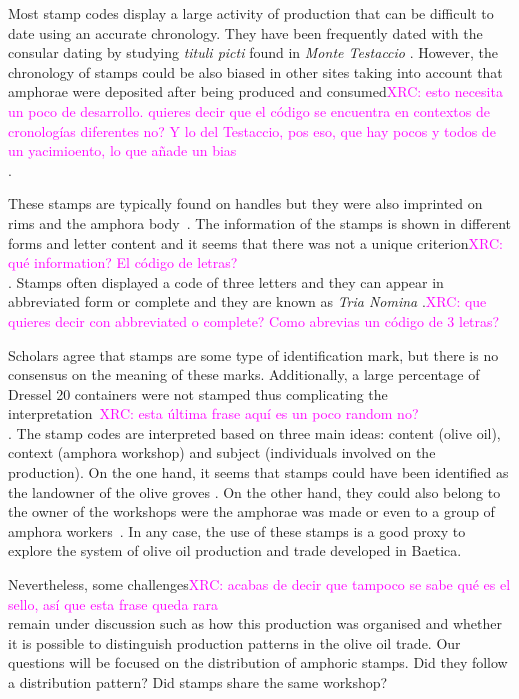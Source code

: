 \documentclass[review]{elsarticle}
\newcommand{\memo}[2]{\textcolor{#1}{#2}}
\newcommand{\xavi}[1]{\memo{magenta}{XRC: #1\\}}
\begin{document}
Most stamp codes display a large activity of production that can be difficult to date using an accurate chronology. They have been frequently dated with the consular dating by studying \textit{tituli picti} found in \textit{Monte Testaccio} \citep{Testaccio1, berni_millet_epigrafianforica_2008}. However, the chronology of stamps could be also biased in other sites taking into account that amphorae were deposited after being produced and consumed\xavi{esto necesita un poco de desarrollo. quieres decir que el código se encuentra en contextos de cronologías diferentes no? Y lo del Testaccio, pos eso, que hay pocos y todos de un yacimioento, lo que añade un bias}.  

These stamps are typically found on handles but they were also imprinted on rims and the amphora body~\citep{millet_anforas_1998}. The information of the stamps is shown in different forms and letter content and it seems that there was not a unique criterion\xavi{qué information? El código de letras?}. Stamps often displayed a code of three letters and they can appear in abbreviated form or complete and they are known as \textit{Tria Nomina} \citep{berni_millet_amphora_1996}.\xavi{que quieres decir con abbreviated o complete? Como abrevias un código de 3 letras?}

Scholars agree that stamps are some type of identification mark, but there is no consensus on the meaning of these marks\citep{rodriguez_baetican_1998}. Additionally, a large percentage of Dressel 20 containers were not stamped thus complicating the interpretation~\xavi{esta última frase aquí es un poco random no?}. The stamp codes are interpreted based on three main ideas: content (olive oil), context (amphora workshop) and subject (individuals involved on the production). On the one hand, it seems that stamps could have been identified as the landowner of the olive groves \citep{rodriguez_economioleicola_1977}. On the other hand, they could also belong to the owner of the workshops were the amphorae was made or even to a group of amphora workers~\citep{berni_millet_epigrafianforica_2008}. In any case, the use of these stamps is a good proxy to explore the system of olive oil production and trade developed in Baetica.

Nevertheless, some challenges\xavi{acabas de decir que tampoco se sabe qué es el sello, así que esta frase queda rara} remain under discussion such as how this production was organised and whether it is possible to distinguish production patterns in the olive oil trade. Our questions will be focused on the distribution of amphoric stamps. Did they follow a distribution pattern? Did stamps share the same workshop? 
\end{document}
